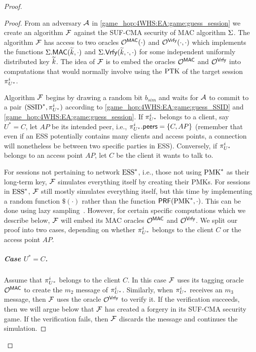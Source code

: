 \begin{proof}
\begin{proof}

From an adversary $\A$ in \cref{game_hop:4WHS:EA:game:guess_session} we create an algorithm $\A[F]$ against the SUF-CMA security of MAC algorithm $\mac$.
The algorithm $\A[F]$ has access to two oracles 
$\mathcal{O}^{\mactag}(\cdot)$ and $\mathcal{O}^{\macvrfy}(\cdot,\cdot)$
which implements the functions $\mac.\mactag(\widetilde{\key},\cdot)$ and $\mac.\macvrfy(\widetilde{\key}, \cdot, \cdot)$ for some independent uniformly distributed key $\widetilde{\key}$.
The idea of $\A[F]$ is to embed the oracles $\mathcal{O}^{\mactag}$ and $\mathcal{O}^{\macvrfy}$ into computations that would normally involve using the $\PTK$ of the target session $\eatarget$.





Algorithm $\A[F]$ begins by drawing a random bit $b_{sim}$
and waits for $\A$ to commit to a pair $(\ssid^*, \eatarget)$ according to \cref{game_hop:4WHS:EA:game:guess_SSID} and \cref{game_hop:4WHS:EA:game:guess_session}.
If $\eatarget$ belongs to a client,
say $U^* = C$,
let $AP$ be its intended peer,
i.e., $\eatarget.\peers = \lbrace C, AP \rbrace$
(remember that even if an ESS potentially contains many clients and access points,
a connection will nonetheless be between two specific parties in ESS).
Conversely,
if $\eatarget$ belongs to an access point $AP$,
let $C$ be the client it wants to talk to.




For sessions not pertaining to network $\ess^*$,
i.e.,
those not using $\PMK^*$ as their long-term key,
$\A[F]$ simulates everything itself by creating their PMKs.
For sessions in $\ess^*$,
$\A[F]$ still mostly simulates everything itself,
but this time by implementing a random function $\$(\cdot)$ rather than the function $\mathsf{PRF}(\PMK^*, \cdot)$.
This can be done using lazy sampling~\cite[Section~4.3]{EPRINT:BelRog04}.
However,
for certain specific computations which we describe below,
$\A[F]$ will embed its MAC oracles $\mathcal{O}^{\mactag}$ and $\mathcal{O}^{\macvrfy}$. 
We split our proof into two cases,
depending on whether $\eatarget$ belongs to the client $C$ or the access point $AP$.






\subparagraph{Case \texorpdfstring{$U^* = C$}{U* = C}.}
Assume that $\eatarget$ belongs to the client $C$.
In this case $\A[F]$ uses its tagging oracle $\mathcal{O}^{\mactag}$ to create the $m_2$ message of $\eatarget$.
Similarly,
when $\eatarget$ receives an $m_3$ message,
then $\A[F]$ uses the oracle $\mathcal{O}^{\macvrfy}$ to verify it.
If the verification succeeds,
then we will argue below that $\A[F]$ has created a forgery in its SUF-CMA security game.
If the verification fails,
then $\A[F]$ discards the message and continues the simulation.


\end{proof}
\end{proof}
